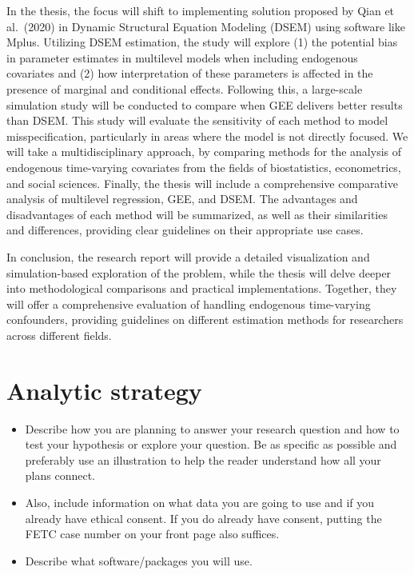 \documentclass[
  12pt,
  a4paper,
]{article}
\providecommand{\tightlist}{%
  \setlength{\itemsep}{0pt}\setlength{\parskip}{0pt}}\usepackage{longtable,booktabs,array}
\begin{document}
In the thesis, the focus will shift to implementing solution proposed by
Qian et al.~(2020) in Dynamic Structural Equation Modeling (DSEM) using
software like Mplus. Utilizing DSEM estimation, the study will explore
(1) the potential bias in parameter estimates in multilevel models when
including endogenous covariates and (2) how interpretation of these
parameters is affected in the presence of marginal and conditional
effects. Following this, a large-scale simulation study will be
conducted to compare when GEE delivers better results than DSEM. This
study will evaluate the sensitivity of each method to model
misspecification, particularly in areas where the model is not directly
focused. We will take a multidisciplinary approach, by comparing methods
for the analysis of endogenous time-varying covariates from the fields
of biostatistics, econometrics, and social sciences. Finally, the thesis
will include a comprehensive comparative analysis of multilevel
regression, GEE, and DSEM. The advantages and disadvantages of each
method will be summarized, as well as their similarities and
differences, providing clear guidelines on their appropriate use cases.

In conclusion, the research report will provide a detailed visualization
and simulation-based exploration of the problem, while the thesis will
delve deeper into methodological comparisons and practical
implementations. Together, they will offer a comprehensive evaluation of
handling endogenous time-varying confounders, providing guidelines on
different estimation methods for researchers across different fields.

\hypertarget{analytic-strategy}{%
\section{Analytic strategy}\label{analytic-strategy}}

\begin{itemize}
\tightlist
\item
  Describe how you are planning to answer your research question and how
  to test your hypothesis or explore your question. Be as specific as
  possible and preferably use an illustration to help the reader
  understand how all your plans connect.
\item
  Also, include information on what data you are going to use and if you
  already have ethical consent. If you do already have consent, putting
  the FETC case number on your front page also suffices.
\item
  Describe what software/packages you will use.
\end{itemize}
\end{document}
